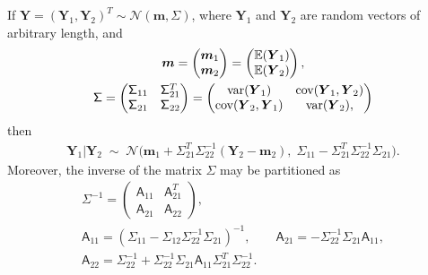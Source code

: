 \documentclass{svjour3}                     %
\newcommand{\bm}[1]{\boldsymbol{#1}}
\newcommand{\mSigma}{\mathsf{\Sigma}}
\newcommand{\Ex}{\mathbb{E}}
\newcommand{\vm}{\bm{m}}
\newcommand{\vY}{\bm{Y}}
\newcommand{\mA}{\mathsf{A}}
\newcommand{\cov}{{\textup{cov}}}
\newcommand{\var}{{\textup{var}}}
\newcommand{\calN}{\mathcal{N}}
\begin{document}
\begin{lemma} \cite[(A.6), (A.11--13)]{RasWil06a} \label{thrm:condDist} If $\vY = (\vY_1, \vY_2)^T \sim \calN (\vm,\mSigma)$, where $\vY_1$ and $\vY_2$ are random vectors of arbitrary length, and 
	\begin{gather*}
	\vm = \begin{pmatrix} \vm_1 \\ \vm_2 \end{pmatrix} = \begin{pmatrix} \Ex(\vY_1) \\ \Ex(\vY_2) \end{pmatrix}, \\
	\mSigma = \begin{pmatrix}
	\mSigma_{11} & \mSigma_{21}^T \\ 	\mSigma_{21} & \mSigma_{22}
	\end{pmatrix} =
	\begin{pmatrix}
	\var(\vY_{1}) & \cov(\vY_{1}, \vY_2) \\ 	\cov(\vY_2,\vY_{1}) & \var(\vY_{2}),
	\end{pmatrix} 
	\end{gather*}
	then 
	\begin{align*}
	\vY_1 \vert \vY_2 \; \sim \; \calN \bigl(\vm_1 + \mSigma_{21}^T \mSigma_{22}^{-1}(\vY_2 - \vm_2),  \; \mSigma_{11} - \mSigma_{21}^T \mSigma_{22}^{-1} \mSigma_{21} \bigr).
	\end{align*}
Moreover, the inverse of the matrix $\mSigma$ may be partitioned as
\begin{gather*}
\mSigma^{-1} = \begin{pmatrix} \mA_{11} & \mA_{21}^T \\ \mA_{21} & \mA_{22} \end{pmatrix}, \\
\mA_{11} = (\mSigma_{11} - \mSigma_{12} \mSigma_{22}^{-1} \mSigma_{21})^{-1}, \qquad 
\mA_{21} = -  \mSigma_{22}^{-1} \mSigma_{21} \mA_{11}, \\ 
\mA_{22} = \mSigma_{22}^{-1} + \mSigma_{22}^{-1} \mSigma_{21} \mA_{11} \mSigma_{21}^T \mSigma_{22}^{-1}.
\end{gather*}

\end{lemma}
\end{document}
